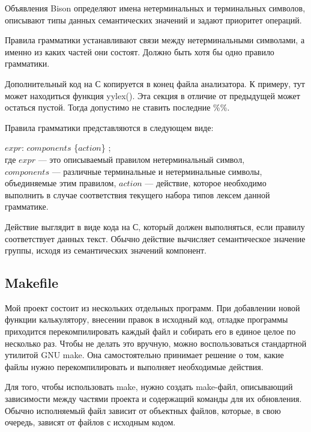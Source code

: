 \documentclass[bachelor, och, coursework, times]{SCWorks}
\begin{document}
Объявления Bison определяют имена нетерминальных и терминальных символов, описывают типы данных семантических значений и задают приоритет операций.

Правила грамматики устанавливают связи между нетерминальными символами, а именно из каких частей они состоят. Должно быть хотя бы одно правило грамматики.

Дополнительный код на С копируется в конец файла анализатора. К примеру, тут может находиться функция yylex(). Эта секция в отличие от предыдущей может остаться пустой. Тогда допустимо не ставить последние \%\%.

Правила грамматики представляются в следующем виде:

$expr$: \quad $components$ \{$action$\} ; \\

где $expr$ --- это описываемый правилом нетерминальный символ,\\ $components$ --- различные терминальные и нетерминальные символы, объединяемые этим правилом, $action$ --- действие, которое необходимо выполнить в случае соответствия текущего набора типов лексем данной грамматике.

Действие выглядит в виде кода на С, который должен выполняться, если правилу соответствует данных текст. Обычно действие вычисляет семантическое значение группы, исходя из семантических значений компонент.~\cite{opennet}







\subsection{Makefile}

Мой проект состоит из нескольких отдельных программ. При добавлении новой функции калькулятору, внесении правок в исходный код, отладке программы приходится перекомпилировать каждый файл и собирать его в единое целое по несколько раз. Чтобы не делать это вручную, можно воспользоваться стандартной утилитой GNU make. Она самостоятельно принимает решение о том, какие файлы нужно перекомпилировать и выполняет необходимые действия.

Для того, чтобы использовать make, нужно создать make-файл, описывающий зависимости между частями проекта и содержащий команды для их обновления. Обычно исполняемый файл зависит от объектных файлов, которые, в свою очередь, зависят от файлов с исходным кодом.
\end{document}
